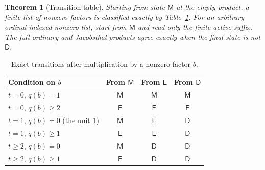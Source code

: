 \documentclass[11pt,letterpaper]{article}
\newtheorem{theorem}{Theorem}[section]
\theoremstyle{definition}
\theoremstyle{remark}
\begin{document}
\begin{theorem}[Transition table]\label{thm:automaton}
Starting from state $\mathsf M$ at the empty product, a finite list of
nonzero factors is classified exactly by Table~\ref{tab:states}.
For an arbitrary ordinal-indexed nonzero list, start from $\mathsf M$
and read only the finite active suffix. The full ordinary and Jacobsthal
products agree exactly when the final state is not $\mathsf D$.
\end{theorem}

\begin{table}[htbp]
\centering
\caption{Exact transitions after multiplication by a nonzero factor $b$.}
\label{tab:states}
\begin{tabular}{@{}p{}ccc@{}}
\toprule
Condition on $b$ & From $\mathsf M$ & From $\mathsf E$ & From $\mathsf D$\\
\midrule
$t=0$, $q(b)=1$ & $\mathsf M$ & $\mathsf M$ & $\mathsf M$\\
$t=0$, $q(b)\geq2$ & $\mathsf E$ & $\mathsf E$ & $\mathsf E$\\
$t=1$, $q(b)=0$ (the unit $1$) & $\mathsf M$ & $\mathsf E$ & $\mathsf D$\\
$t=1$, $q(b)\geq1$ & $\mathsf E$ & $\mathsf E$ & $\mathsf D$\\
$t\geq2$, $q(b)=0$ & $\mathsf M$ & $\mathsf D$ & $\mathsf D$\\
$t\geq2$, $q(b)\geq1$ & $\mathsf E$ & $\mathsf D$ & $\mathsf D$\\
\bottomrule
\end{tabular}
\end{table}
\end{document}
